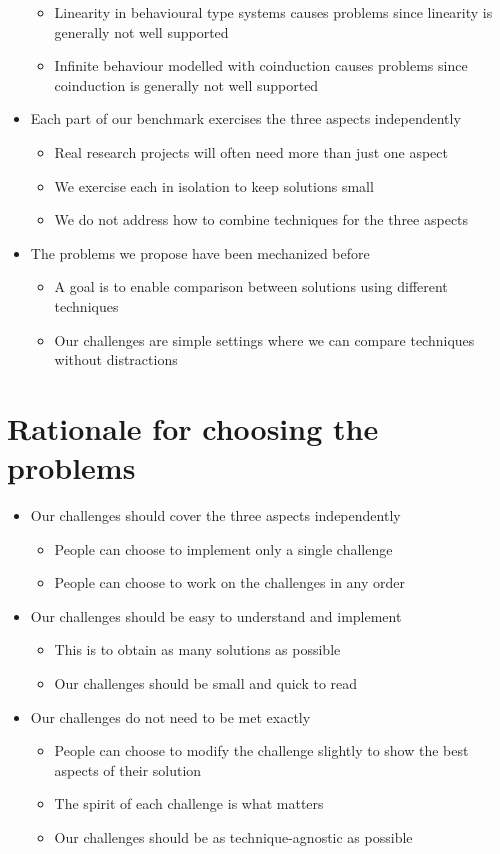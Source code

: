 \documentclass{article}
\begin{document}
\begin{itemize}
\begin{itemize}
  \item Linearity in behavioural type systems causes problems since linearity is generally not well supported
  \item Infinite behaviour modelled with coinduction causes problems since coinduction is generally not well supported
  \end{itemize}
\item Each part of our benchmark exercises the three aspects independently
  \begin{itemize}
  \item Real research projects will often need more than just one aspect
  \item We exercise each in isolation to keep solutions small
  \item We do not address how to combine techniques for the three aspects
  \end{itemize}
\item The problems we propose have been mechanized before
  \begin{itemize}
  \item A goal is to enable comparison between solutions using different techniques
  \item Our challenges are simple settings where we can compare techniques without distractions
  \end{itemize}
\end{itemize}

\section{Rationale for choosing the problems}
\begin{itemize}
\item Our challenges should cover the three aspects independently
  \begin{itemize}
  \item People can choose to implement only a single challenge
  \item People can choose to work on the challenges in any order
  \end{itemize}
\item Our challenges should be easy to understand and implement
  \begin{itemize}
  \item This is to obtain as many solutions as possible
  \item Our challenges should be small and quick to read
  \end{itemize}
\item Our challenges do not need to be met exactly
  \begin{itemize}
  \item People can choose to modify the challenge slightly to show the best aspects of their solution
  \item The spirit of each challenge is what matters
  \item Our challenges should be as technique-agnostic as possible
  \end{itemize}
\end{itemize}
\end{document}
